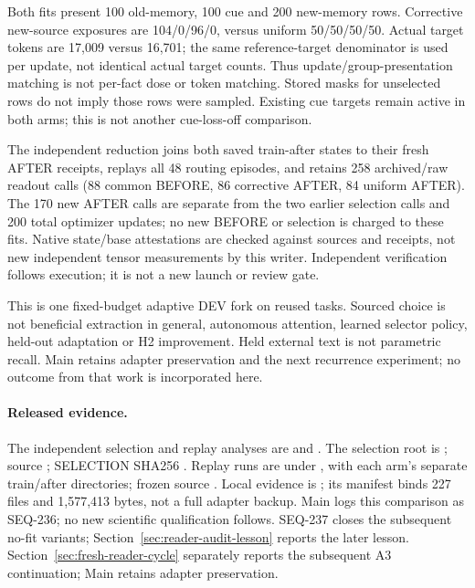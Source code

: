 \documentclass{article}
\begin{document}
Both fits present 100 old-memory, 100 cue and 200 new-memory rows. Corrective
new-source exposures are 104/0/96/0, versus uniform 50/50/50/50. Actual target
tokens are 17,009 versus 16,701; the same reference-target denominator is used
per update, not identical actual target counts. Thus update/group-presentation
matching is not per-fact dose or token matching. Stored masks for unselected
rows do not imply those rows were sampled. Existing cue targets remain active
in both arms; this is not another cue-loss-off comparison.

The independent reduction joins both saved train-after states to their fresh
AFTER receipts, replays all 48 routing episodes, and retains 258 archived/raw
readout calls (88 common BEFORE, 86 corrective AFTER, 84 uniform AFTER). The
170 new AFTER calls are separate from the two earlier selection calls and 200
total optimizer updates; no new BEFORE or selection is charged to these fits.
Native state/base attestations are checked against sources and receipts, not
new independent tensor measurements by this writer. Independent verification
follows execution; it is not a new launch or review gate.

This is one fixed-budget adaptive DEV fork on reused tasks. Sourced choice is
not beneficial extraction in general, autonomous attention, learned selector
policy, held-out adaptation or H2 improvement. Held external text is not
parametric recall. Main retains adapter preservation and the next recurrence
experiment; no outcome from that work is incorporated here.

\paragraph{Released evidence.}
The independent selection and replay analyses are
and .
The selection root is
;
source ; SELECTION SHA256
.
Replay runs are under
,
with each arm's separate train/after directories; frozen source
.
Local evidence is ;
its manifest binds 227 files and 1,577,413 bytes, not a full adapter backup.
Main logs this comparison as SEQ-236; no new scientific qualification follows.
SEQ-237 closes the subsequent no-fit variants; Section~\ref{sec:reader-audit-lesson}
reports the later lesson. Section~\ref{sec:fresh-reader-cycle} separately reports
the subsequent A3 continuation; Main retains adapter preservation.
\end{document}
